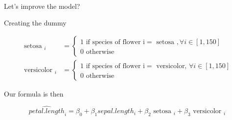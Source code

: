 \documentclass[australian,ignorenonframetext,aspectratio=169]{beamer}
\begin{document}
\begin{frame}{Let's improve the model?}
\protect\hypertarget{lets-improve-the-model}{}

\begin{block}{Creating the dummy}

\[\begin{aligned} \text { setosa }_i &=\left\{\begin{array}{l}1 \text { if species of flower } \mathrm{i}=\text { setosa }, \forall i \in[1,150] \\ 0 \text { otherwise }\end{array}\right.\\ \text { versicolor }_i &=\left\{\begin{array}{l}1 \text { if species of flower } \mathrm{i}=\text { versicolor, } \forall i \in[1,150] \\ 0 \text { otherwise }\end{array}\right.\end{aligned}\]

\end{block}

\begin{block}{Our formula is then}

\[\widehat{petal.length}_i = \beta_0 + \beta_1 sepal.length_i + \beta_2 \text { setosa }_i + \beta_3 \text { versicolor }_i\]

\end{block}

\end{frame}
\end{document}
